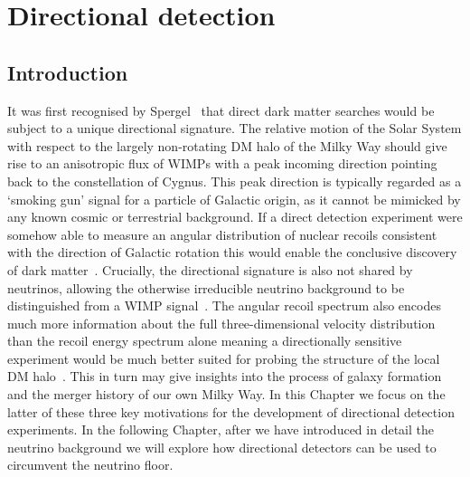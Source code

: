 \chapter{Directional detection}\label{chapter:directional}

\section{Introduction}\label{sec:directional_intro}
It was first recognised by Spergel~\cite{Spergel:1987kx} that direct dark matter searches would be subject to a unique directional signature. The relative motion of the Solar System with respect to the largely non-rotating DM halo of the Milky Way should give rise to an anisotropic flux of WIMPs with a peak incoming direction pointing back to the constellation of Cygnus. This peak direction is typically regarded as a `smoking gun' signal for a particle of Galactic origin, as it cannot be mimicked by any known cosmic or terrestrial background. If a direct detection experiment were somehow able to measure an angular distribution of nuclear recoils consistent with the direction of Galactic rotation this would enable the conclusive discovery of dark matter~\cite{Copi:1999pw,Morgan:2004ys,Billard:2009mf,Green:2010zm,Mayet:2016zxu}. Crucially, the directional signature is also not shared by neutrinos, allowing the otherwise irreducible neutrino background to be distinguished from a WIMP signal~\cite{Grothaus:2014hja,O'Hare:2015mda}. The angular recoil spectrum also encodes much more information about the full three-dimensional velocity distribution than the recoil energy spectrum alone meaning a directionally sensitive experiment would be much better suited for probing the structure of the local DM halo~\cite{Billard:2010jh,Billard:2012qu,Lee:2012pf,O'Hare:2014oxa}. This in turn may give insights into the process of galaxy formation and the merger history of our own Milky Way. In this Chapter we focus on the latter of these three key motivations for the development of directional detection experiments. In the following Chapter, after we have introduced in detail the neutrino background we will explore how directional detectors can be used to circumvent the neutrino floor. 

